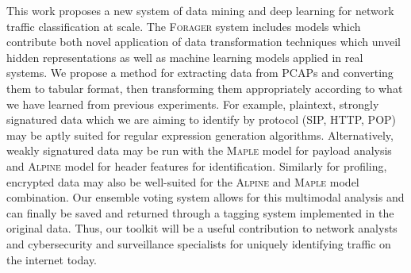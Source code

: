 This work proposes a new system of data mining and deep learning for network traffic classification at scale. The \textsc{Forager} system includes models which contribute both novel application of data transformation techniques which unveil hidden representations as well as machine learning models applied in real systems. We propose a method for extracting data from PCAPs and converting them to tabular format, then transforming them appropriately according to what we have learned from previous experiments. For example, plaintext, strongly signatured data which we are aiming to identify by protocol (SIP, HTTP, POP) may be aptly suited for regular expression generation algorithms. Alternatively, weakly signatured data may be run with the \textsc{Maple} model for payload analysis and \textsc{Alpine} model for header features for identification. Similarly for profiling, encrypted data may also be well-suited for the \textsc{Alpine} and \textsc{Maple} model combination. Our ensemble voting system allows for this multimodal analysis and can finally be saved and returned through a tagging system implemented in the original data. Thus, our toolkit will be a useful contribution to network analysts and cybersecurity and surveillance specialists for uniquely identifying traffic on the internet today.
